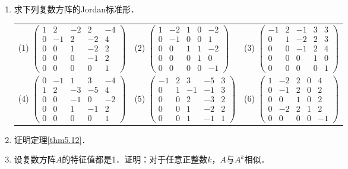 \documentclass[a4paper,fontset=windows]{ctexbook}
\theoremstyle{definition}
\begin{document}
\begin{enumerate}
\item 求下列复数方阵的Jordan标准形．

\hspace*{-6pt}\begin{tabular}{lll}
(1) $\begin{pmatrix}1&2&-2&2&-4 \\ 0&-1&2&-2&4 \\ 0&0&1&-2&2 \\ 0&0&0&-1&2 \\ 0&0&0&0&1\end{pmatrix}$ &
(2) $\begin{pmatrix}1&-2&1&0&-2 \\ 0&-1&0&0&1 \\ 0&0&1&1&-2 \\ 0&0&0&1&0 \\ 0&0&0&0&-1\end{pmatrix}$ &
(3) $\begin{pmatrix}-1&2&-1&3&3 \\ 0&1&-2&2&3 \\ 0&0&-1&2&4 \\ 0&0&0&1&0 \\ 0&0&0&0&1\end{pmatrix}$ \\
(4) $\begin{pmatrix}0&-1&1&3&-4 \\ 1&2&-3&-5&4 \\ 0&0&-1&0&-2 \\ 0&0&1&-1&2 \\ 0&0&0&0&1\end{pmatrix}$ &
(5) $\begin{pmatrix}-1&2&3&-5&3 \\ 0&1&-1&-1&3 \\ 0&0&2&-3&2 \\ 0&0&1&-2&2 \\ 0&0&1&-1&1\end{pmatrix}$ &
(6) $\begin{pmatrix}1&-2&2&0&4 \\ 0&-1&2&0&2 \\ 0&0&1&0&2 \\ 0&-2&2&1&2 \\ 0&0&0&0&-1\end{pmatrix}$
\end{tabular}

\item 证明定理\ref{thm5.12}．

\item 设复数方阵$A$的特征值都是1．证明：对于任意正整数$k$，$A$与$A^k$相似．


\end{enumerate}
\end{document}
